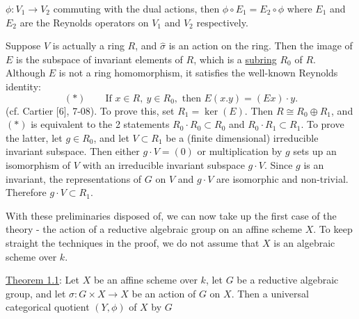
$\phi:V_1\longrightarrow V_2$ commuting with the dual actions, then $\phi\circ E_1=E_2\circ\phi$ where $E_1$ and $E_2$ are the Reynolds operators on $V_1$ and $V_2$ respectively.

Suppose $V$ is actually a ring $R$, and $\hat\sigma$ is an action on the ring. Then the image of $E$ is the subspace of invariant elements of $R$, which is a \uline{subring} $R_0$ of $R$. Although $E$ is not a ring homomorphism, it satisfies the well-known Reynolds identity:
\[
(*)\qquad\text{If }x\in R,\ y\in R_0,\text{ then }E(x.y)=(Ex)\cdot y.
\]
(cf. Cartier [6], 7-08). To prove this, set $R_1=\ker(E)$. Then $R\cong R_0\oplus R_1$, and $(*)$ is equivalent to the 2 statements $R_0\cdot R_0\subset R_0$ and $R_0\cdot R_1\subset R_1$. To prove the latter, let $g\in R_0$, and let $V\subset R_1$ be a (finite dimensional) irreducible invariant subspace. Then either $g\cdot V=(0)$ or multiplication by $g$ sets up an isomorphism of $V$ with an irreducible invariant subspace $g\cdot V$. Since $g$ is an invariant, the representations of $G$ on $V$ and $g\cdot V$ are isomorphic and non-trivial. Therefore $g\cdot V\subset R_1$.

 With these preliminaries disposed of, we can now take up the first case of the theory - the action of a reductive algebraic group on an affine scheme $X$. To keep straight the techniques in the proof, we do not assume that $X$ is an algebraic scheme over $k$.

\uline{Theorem 1.1}: Let $X$ be an affine scheme over $k$, let $G$ be a reductive algebraic group, and let $\sigma:G\mathbin{\times}X\longrightarrow X$ be an action of $G$ on $X$. Then a universal categorical quotient $(Y,\phi)$ of $X$ by $G$

